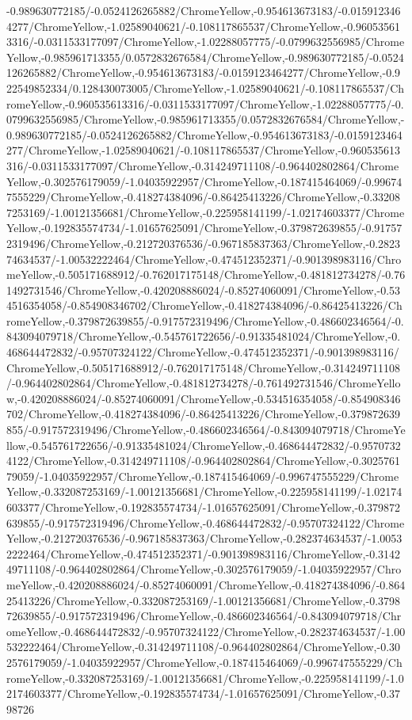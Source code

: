 {\begin{tikzternal}
{-0.989630772185/-0.0524126265882/ChromeYellow,-0.954613673183/-0.0159123464277/ChromeYellow,-1.02589040621/-0.108117865537/ChromeYellow,-0.960535613316/-0.0311533177097/ChromeYellow,-1.02288057775/-0.0799632556985/ChromeYellow,-0.985961713355/0.0572832676584/ChromeYellow,-0.989630772185/-0.0524126265882/ChromeYellow,-0.954613673183/-0.0159123464277/ChromeYellow,-0.922549852334/0.128430073005/ChromeYellow,-1.02589040621/-0.108117865537/ChromeYellow,-0.960535613316/-0.0311533177097/ChromeYellow,-1.02288057775/-0.0799632556985/ChromeYellow,-0.985961713355/0.0572832676584/ChromeYellow,-0.989630772185/-0.0524126265882/ChromeYellow,-0.954613673183/-0.0159123464277/ChromeYellow,-1.02589040621/-0.108117865537/ChromeYellow,-0.960535613316/-0.0311533177097/ChromeYellow,-0.314249711108/-0.964402802864/ChromeYellow,-0.302576179059/-1.04035922957/ChromeYellow,-0.187415464069/-0.996747555229/ChromeYellow,-0.418274384096/-0.86425413226/ChromeYellow,-0.332087253169/-1.00121356681/ChromeYellow,-0.225958141199/-1.02174603377/ChromeYellow,-0.192835574734/-1.01657625091/ChromeYellow,-0.379872639855/-0.917572319496/ChromeYellow,-0.212720376536/-0.967185837363/ChromeYellow,-0.282374634537/-1.00532222464/ChromeYellow,-0.474512352371/-0.901398983116/ChromeYellow,-0.505171688912/-0.762017175148/ChromeYellow,-0.481812734278/-0.761492731546/ChromeYellow,-0.420208886024/-0.85274060091/ChromeYellow,-0.534516354058/-0.854908346702/ChromeYellow,-0.418274384096/-0.86425413226/ChromeYellow,-0.379872639855/-0.917572319496/ChromeYellow,-0.486602346564/-0.843094079718/ChromeYellow,-0.545761722656/-0.91335481024/ChromeYellow,-0.468644472832/-0.95707324122/ChromeYellow,-0.474512352371/-0.901398983116/ChromeYellow,-0.505171688912/-0.762017175148/ChromeYellow,-0.314249711108/-0.964402802864/ChromeYellow,-0.481812734278/-0.761492731546/ChromeYellow,-0.420208886024/-0.85274060091/ChromeYellow,-0.534516354058/-0.854908346702/ChromeYellow,-0.418274384096/-0.86425413226/ChromeYellow,-0.379872639855/-0.917572319496/ChromeYellow,-0.486602346564/-0.843094079718/ChromeYellow,-0.545761722656/-0.91335481024/ChromeYellow,-0.468644472832/-0.95707324122/ChromeYellow,-0.314249711108/-0.964402802864/ChromeYellow,-0.302576179059/-1.04035922957/ChromeYellow,-0.187415464069/-0.996747555229/ChromeYellow,-0.332087253169/-1.00121356681/ChromeYellow,-0.225958141199/-1.02174603377/ChromeYellow,-0.192835574734/-1.01657625091/ChromeYellow,-0.379872639855/-0.917572319496/ChromeYellow,-0.468644472832/-0.95707324122/ChromeYellow,-0.212720376536/-0.967185837363/ChromeYellow,-0.282374634537/-1.00532222464/ChromeYellow,-0.474512352371/-0.901398983116/ChromeYellow,-0.314249711108/-0.964402802864/ChromeYellow,-0.302576179059/-1.04035922957/ChromeYellow,-0.420208886024/-0.85274060091/ChromeYellow,-0.418274384096/-0.86425413226/ChromeYellow,-0.332087253169/-1.00121356681/ChromeYellow,-0.379872639855/-0.917572319496/ChromeYellow,-0.486602346564/-0.843094079718/ChromeYellow,-0.468644472832/-0.95707324122/ChromeYellow,-0.282374634537/-1.00532222464/ChromeYellow,-0.314249711108/-0.964402802864/ChromeYellow,-0.302576179059/-1.04035922957/ChromeYellow,-0.187415464069/-0.996747555229/ChromeYellow,-0.332087253169/-1.00121356681/ChromeYellow,-0.225958141199/-1.02174603377/ChromeYellow,-0.192835574734/-1.01657625091/ChromeYellow,-0.3798726}
\end{tikzternal}}
